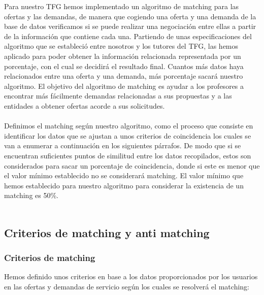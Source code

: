 \documentclass[11pt]{article}
\begin{document}
 Para nuestro TFG hemos implementado un algoritmo de matching para las ofertas y las demandas, de manera que cogiendo una oferta y una demanda de la base de datos verificamos si se puede realizar una negociación entre ellas a partir de la información que contiene cada una. Partiendo de unas especificaciones del algoritmo que se estableció entre nosotros y los tutores del TFG, las hemos aplicado para poder obtener la información relacionada representada por un porcentaje, con el cual  se decidirá el resultado final.  Cuantos más datos haya relacionados entre una oferta y una demanda, más porcentaje sacará nuestro algoritmo. El objetivo del algoritmo de matching es ayudar a los profesores a encontrar más fácilmente demandas relacionadas a sus propuestas y a las entidades a obtener ofertas acorde a sus solicitudes. \\\\
 
 Definimos el matching según nuestro algoritmo, como el proceso que consiste en identificar los datos que se ajustan a unos criterios de coincidencia los cuales se van a enumerar a continuación en los siguientes párrafos. De modo que si se encuentran suficientes puntos de similitud entre los datos recopilados, estos son considerados para sacar un porcentaje de coincidencia, donde si este es menor que el valor mínimo establecido no se considerará matching. El valor mínimo que hemos establecido para nuestro algoritmo para considerar la existencia de un matching es 50\%.
 \\\\
 
  \subsection{Criterios de matching y anti matching}
 \subsubsection{Criterios de matching }
  
 Hemos definido unos criterios en base a los datos proporcionados por los usuarios en las ofertas y demandas de servicio según los cuales se resolverá el matching:
 
\end{document}
